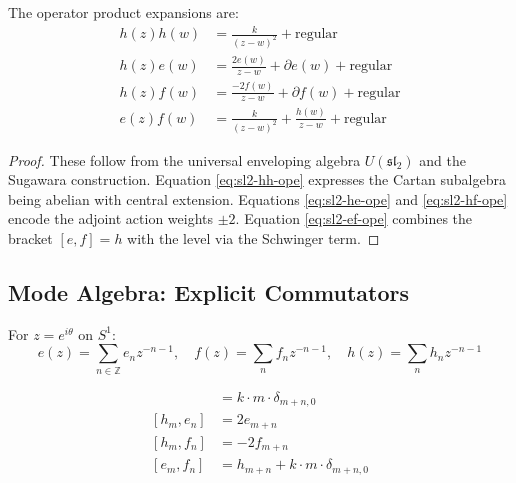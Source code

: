 \begin{theorem}
\label{thm:sl2-ope-complete}
The operator product expansions are:
\begin{align}
h(z)h(w) &= \frac{k}{(z-w)^2} + \text{regular} \label{eq:sl2-hh-ope} \\
h(z)e(w) &= \frac{2e(w)}{z-w} + \partial e(w) + \text{regular} \label{eq:sl2-he-ope} \\
h(z)f(w) &= \frac{-2f(w)}{z-w} + \partial f(w) + \text{regular} \label{eq:sl2-hf-ope} \\
e(z)f(w) &= \frac{k}{(z-w)^2} + \frac{h(w)}{z-w} + \text{regular} \label{eq:sl2-ef-ope}
\end{align}
\end{theorem}

\begin{proof}
These follow from the universal enveloping algebra $U(\mathfrak{sl}_2)$ and the Sugawara construction. Equation \eqref{eq:sl2-hh-ope} expresses the Cartan subalgebra being abelian with central extension. Equations \eqref{eq:sl2-he-ope} and \eqref{eq:sl2-hf-ope} encode the adjoint action weights $\pm 2$. Equation \eqref{eq:sl2-ef-ope} combines the bracket $[e,f] = h$ with the level via the Schwinger term.
\end{proof}

\subsection{Mode Algebra: Explicit Commutators}

\begin{definition}
For $z = e^{i\theta}$ on $S^1$:
$$e(z) = \sum_{n \in \mathbb{Z}} e_n z^{-n-1}, \quad f(z) = \sum_n f_n z^{-n-1}, \quad h(z) = \sum_n h_n z^{-n-1}$$
\end{definition}

\begin{theorem}
\label{thm:sl2-modes}
\begin{align}
[h_m, h_n] &= k \cdot m \cdot \delta_{m+n,0} \label{eq:sl2-mode-hh} \\
[h_m, e_n] &= 2 e_{m+n} \label{eq:sl2-mode-he} \\
[h_m, f_n] &= -2 f_{m+n} \label{eq:sl2-mode-hf} \\
[e_m, f_n] &= h_{m+n} + k \cdot m \cdot \delta_{m+n,0} \label{eq:sl2-mode-ef}
\end{align}
\end{theorem}

